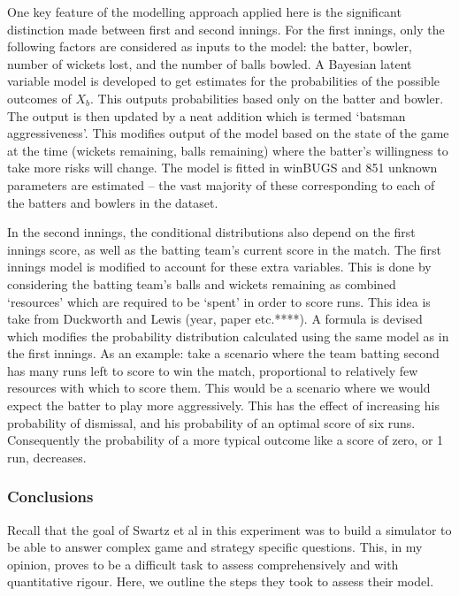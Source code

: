 One key feature of the modelling approach applied here is the significant distinction made between first and second innings. For the first innings, only the following factors are considered as inputs to the model: the batter, bowler, number of wickets lost, and the number of balls bowled. A Bayesian latent variable model is developed to get estimates for the probabilities of the possible outcomes of $X_{b}$. This outputs probabilities based only on the batter and bowler. The output is then updated by a neat addition which is termed ‘batsman aggressiveness’. This modifies output of the model based on the state of the game at the time (wickets remaining, balls remaining) where the batter’s willingness to take more risks will change. The model is fitted in winBUGS and 851 unknown parameters are estimated – the vast majority of these corresponding to each of the batters and bowlers in the dataset.

In the second innings, the conditional distributions also depend on the first innings score, as well as the batting team’s current score in the match. The first innings model is modified to account for these extra variables. This is done by considering the batting team’s balls and wickets remaining as combined ‘resources’ which are required to be ‘spent’ in order to score runs. This idea is take from Duckworth and Lewis (year, paper etc.****). A formula is devised which modifies the probability distribution calculated using the same model as in the first innings. As an example: take a scenario where the team batting second has many runs left to score to win the match, proportional to relatively few resources with which to score them. This would be a scenario where we would expect the batter to play more aggressively. This has the effect of increasing his probability of dismissal, and his probability of an optimal score of six runs. Consequently the probability of a more typical outcome like a score of zero, or 1 run, decreases.

\subsubsection{Conclusions}

Recall that the goal of Swartz et al in this experiment was to build a simulator to be able to answer complex game and strategy specific questions. This, in my opinion, proves to be a difficult task to assess comprehensively and with quantitative rigour. Here, we outline the steps they took to assess their model.

